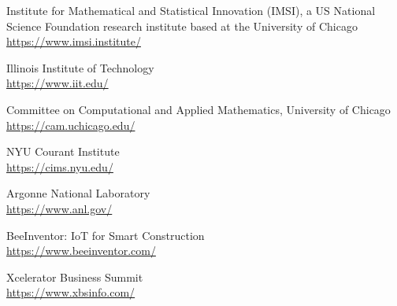 Institute for Mathematical and Statistical Innovation (IMSI), a US National Science Foundation research institute based at the University of Chicago\\
\url{https://www.imsi.institute/}

Illinois Institute of Technology\\
\url{https://www.iit.edu/}

Committee on Computational and Applied Mathematics, University of Chicago\\
\url{https://cam.uchicago.edu/}

NYU Courant Institute\\
\url{https://cims.nyu.edu/}

Argonne National Laboratory\\
\url{https://www.anl.gov/}

BeeInventor: IoT for Smart Construction\\
\url{https://www.beeinventor.com/}

Xcelerator Business Summit\\
\url{https://www.xbsinfo.com/}

